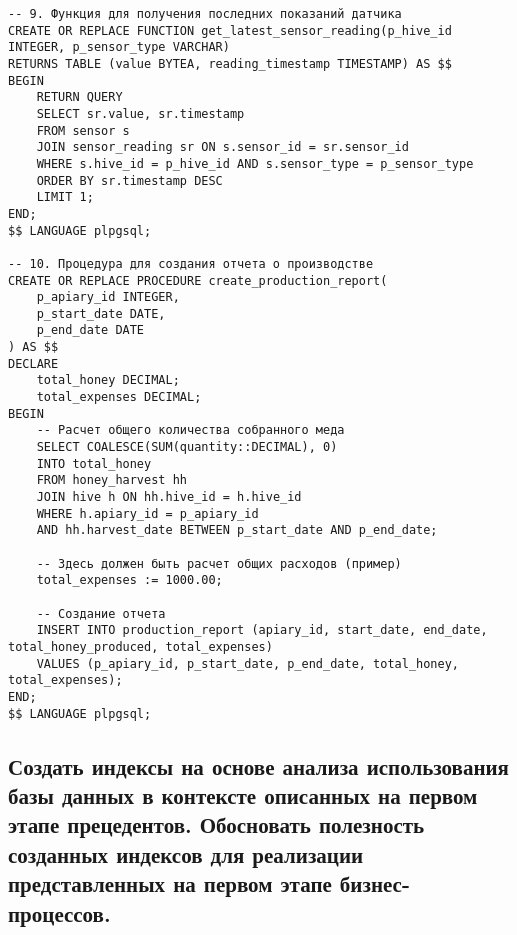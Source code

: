 \documentclass{article}
\begin{document}
\begin{lstlisting}
-- 9. Функция для получения последних показаний датчика
CREATE OR REPLACE FUNCTION get_latest_sensor_reading(p_hive_id INTEGER, p_sensor_type VARCHAR)
RETURNS TABLE (value BYTEA, reading_timestamp TIMESTAMP) AS $$
BEGIN
    RETURN QUERY
    SELECT sr.value, sr.timestamp
    FROM sensor s
    JOIN sensor_reading sr ON s.sensor_id = sr.sensor_id
    WHERE s.hive_id = p_hive_id AND s.sensor_type = p_sensor_type
    ORDER BY sr.timestamp DESC
    LIMIT 1;
END;
$$ LANGUAGE plpgsql;

-- 10. Процедура для создания отчета о производстве
CREATE OR REPLACE PROCEDURE create_production_report(
    p_apiary_id INTEGER,
    p_start_date DATE,
    p_end_date DATE
) AS $$
DECLARE
    total_honey DECIMAL;
    total_expenses DECIMAL;
BEGIN
    -- Расчет общего количества собранного меда
    SELECT COALESCE(SUM(quantity::DECIMAL), 0)
    INTO total_honey
    FROM honey_harvest hh
    JOIN hive h ON hh.hive_id = h.hive_id
    WHERE h.apiary_id = p_apiary_id
    AND hh.harvest_date BETWEEN p_start_date AND p_end_date;

    -- Здесь должен быть расчет общих расходов (пример)
    total_expenses := 1000.00;

    -- Создание отчета
    INSERT INTO production_report (apiary_id, start_date, end_date, total_honey_produced, total_expenses)
    VALUES (p_apiary_id, p_start_date, p_end_date, total_honey, total_expenses);
END;
$$ LANGUAGE plpgsql;

\end{lstlisting}

\subsection{Создать индексы на основе анализа использования базы данных в контексте описанных на первом этапе прецедентов. Обосновать полезность созданных индексов для реализации представленных на первом этапе бизнес-процессов.}
\end{document}
